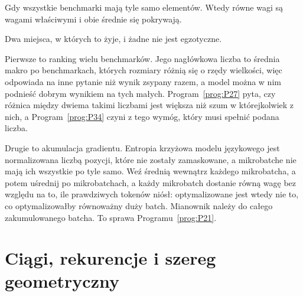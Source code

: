 \begin{fr}
\begin{ansblock}
Gdy wszystkie benchmarki mają tyle samo elementów. Wtedy równe wagi są wagami
właściwymi i obie średnie się pokrywają.
\end{ansblock}

\begin{aibox}
Dwa miejsca, w których to żyje, i żadne nie jest egzotyczne.

Pierwsze to ranking wielu benchmarków. Jego nagłówkowa liczba to średnia makro
po benchmarkach, których rozmiary różnią się o rzędy wielkości, więc odpowiada
na inne pytanie niż wynik zsypany razem, a model można w nim podnieść dobrym
wynikiem na tych małych. Program~\ref{prog:P27} pyta, czy różnica między
dwiema takimi liczbami jest większa niż szum w którejkolwiek z nich, a
Program~\ref{prog:P34} czyni z tego wymóg, który musi spełnić podana liczba.

Drugie to akumulacja gradientu. Entropia krzyżowa modelu językowego jest
normalizowana liczbą pozycji, które nie zostały zamaskowane, a mikrobatche nie
mają ich wszystkie po tyle samo. Weź średnią wewnątrz każdego mikrobatcha, a
potem uśrednij po mikrobatchach, a każdy mikrobatch dostanie równą wagę bez
względu na to, ile prawdziwych tokenów niósł: optymalizowane jest wtedy nie
to, co optymalizowałby równoważny duży batch. Mianownik należy do całego
zakumulowanego batcha. To sprawa Programu~\ref{prog:P21}.
\end{aibox}
\end{fr}


\section{Ciągi, rekurencje i szereg geometryczny}
\label{sec:F04-sequences}

